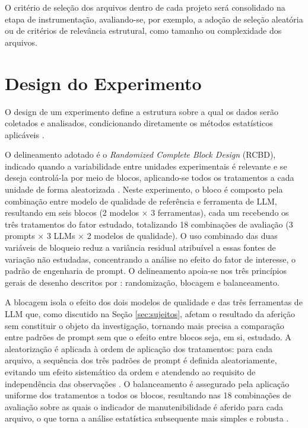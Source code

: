 O critério de seleção dos arquivos dentro de cada projeto será consolidado na etapa de instrumentação, avaliando-se, por exemplo, a adoção de seleção aleatória ou de critérios de relevância estrutural, como tamanho ou complexidade dos arquivos.

\section{Design do Experimento}
\label{sec:design_do_experimento}

O design de um experimento define a estrutura sobre a qual os dados serão coletados e analisados, condicionando diretamente os métodos estatísticos aplicáveis .

O delineamento adotado é o \textit{Randomized Complete Block Design} (RCBD), indicado quando a variabilidade entre unidades experimentais é relevante e se deseja controlá-la por meio de blocos, aplicando-se todos os tratamentos a cada unidade de forma aleatorizada . Neste experimento, o bloco é composto pela combinação entre modelo de qualidade de referência e ferramenta de LLM, resultando em seis blocos (2 modelos × 3 ferramentas), cada um recebendo os três tratamentos do fator estudado, totalizando 18 combinações de avaliação (3 prompts × 3 LLMs × 2 modelos de qualidade). O uso combinado das duas variáveis de bloqueio reduz a variância residual atribuível a essas fontes de variação não estudadas, concentrando a análise no efeito do fator de interesse, o padrão de engenharia de prompt. O delineamento apoia-se nos três princípios gerais de desenho descritos por : randomização, blocagem e balanceamento.

A blocagem isola o efeito dos dois modelos de qualidade e das três ferramentas de LLM que, como discutido na Seção \ref{sec:sujeitos}, afetam o resultado da aferição sem constituir o objeto da investigação, tornando mais precisa a comparação entre padrões de prompt sem que o efeito entre blocos seja, em si, estudado. A aleatorização é aplicada à ordem de aplicação dos tratamentos: para cada arquivo, a sequência dos três padrões de prompt é definida aleatoriamente, evitando um efeito sistemático da ordem e atendendo ao requisito de independência das observações . O balanceamento é assegurado pela aplicação uniforme dos tratamentos a todos os blocos, resultando nas 18 combinações de avaliação sobre as quais o indicador de manutenibilidade é aferido para cada arquivo, o que torna a análise estatística subsequente mais simples e robusta .

